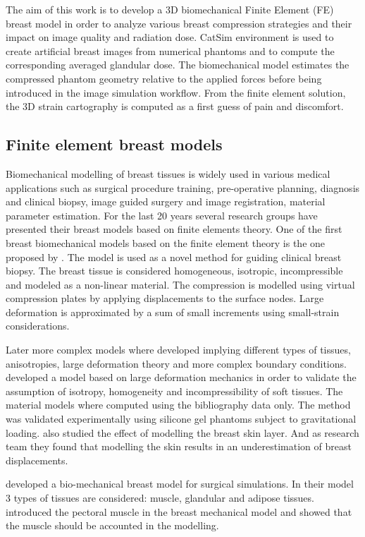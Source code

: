 The aim of this work is to develop a 3D biomechanical Finite Element (FE) breast model in order to analyze various breast compression strategies and their impact on image quality and radiation dose. CatSim environment is used to create artificial breast images from numerical phantoms and to compute the corresponding averaged glandular dose. The biomechanical model estimates the compressed phantom geometry relative to the applied forces before being introduced in the image simulation workflow. From the finite element solution, the 3D strain cartography is computed as a first guess of pain and discomfort.
\subsection{Finite element breast models}
Biomechanical modelling of breast tissues is widely used in various medical applications such as surgical procedure training, pre-operative planning, diagnosis and clinical biopsy, image guided surgery and image registration, material parameter estimation. For the last 20 years several research groups have presented their breast models based on finite elements theory. One of the first breast biomechanical models based on the finite element theory is the one proposed by \cite{azar_methods_2002}. The model is used as a novel method for guiding clinical breast biopsy. The breast tissue is considered homogeneous, isotropic, incompressible and modeled as a non-linear material. The compression is modelled using virtual compression plates by applying displacements to the surface nodes. Large deformation is approximated by a sum of small increments using small-strain considerations.

Later more complex models where developed implying different types of tissues, anisotropies, large deformation theory and more complex boundary conditions. \cite{rajagopal_development_2004} developed a model based on large deformation mechanics in order to validate the assumption of isotropy, homogeneity and incompressibility of soft tissues. The material models where computed using the bibliography data only. The method was validated experimentally using silicone gel phantoms subject to gravitational loading. \cite{rajagopal_modelling_2007} also studied the effect of modelling the breast skin layer. And as \cite{pathmanathan_predicting_2008} research team they found that modelling the skin results in an underestimation of breast displacements. 

\cite{han_development_2012} developed a bio-mechanical breast model for surgical simulations. In their model 3 types of tissues are considered: muscle, glandular and adipose tissues. \cite{gamage_modelling_2012} introduced the pectoral muscle in the breast mechanical model and showed that the muscle should be accounted in the modelling.

